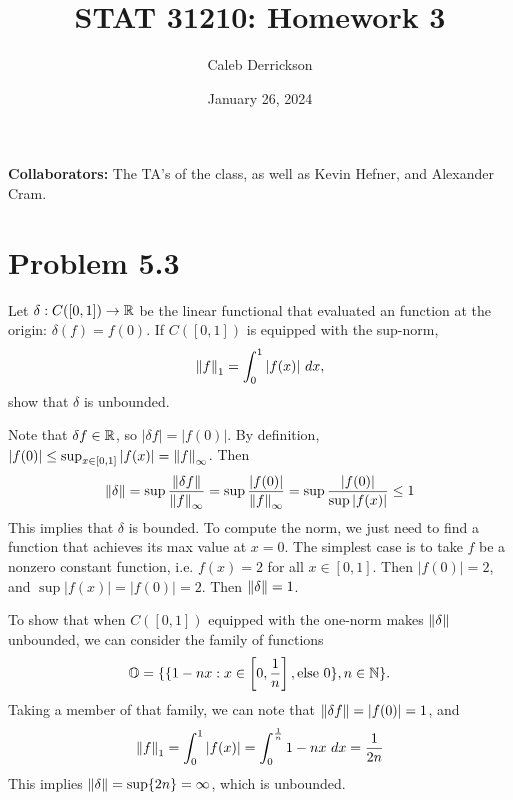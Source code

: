 

\title{STAT 31210: Homework 3}
\author{Caleb Derrickson}
\date{January 26, 2024}


\onehalfspacing
\maketitle
\allowdisplaybreaks
{\color{cit}\vspace{2mm}\noindent\textbf{Collaborators:}} The TA's of the class, as well as Kevin Hefner, and Alexander Cram.

\tableofcontents

\newpage
\section{Problem 5.3}
Let $\delta: C([0, 1]) \rightarrow \mathbb{R}$ be the linear functional that evaluated an function at the origin: $\delta(f) = f(0)$. If $C([0, 1])$ is equipped with the sup-norm,
\[\norm{f}_1 = \int_0^1 |f(x)| \ dx,\]
show that $\delta$ is unbounded.
\partbreak
\begin{solution}
    
    Note that $\delta f \in \mathbb{R}$, so $|\delta f| = |f(0)|$. By definition, $|f(0)| \leq \sup_{x \in [0, 1]} |f(x)| = \norm{f}_\infty$. Then 
    \[
   \norm{\delta} = \sup \frac{\norm{\delta f}}{\norm{f}_\infty} = \sup \frac{|f(0)|}{\norm{f}_\infty} = \sup \frac{|f(0)|}{\sup |f(x)|} \leq 1
    \]
    This implies that $\delta$ is bounded. To compute the norm, we just need to find a function that achieves its max value at $x = 0$. The simplest case is to take $f$ be a nonzero constant function, i.e. $f(x) = 2$ for all $x \in [0, 1]$. Then $|f(0)| = 2$, and $\sup |f(x)| = |f(0)| = 2$. Then $\norm{\delta} = 1$.
    \par
    
    \jump
    To show that when $C([0, 1])$ equipped with the one-norm makes $\norm{\delta}$ unbounded, we can consider the family of functions 
    \[\mathbb{O} = \{ \{1 - nx : x \in \left[0, \frac{1}{n}\right], \text{else } 0\}, n \in \mathbb{N}\}.\]
    Taking a member of that family, we can note that $\norm{\delta f} = |f(0)| = 1$, and
    \[\norm{f}_1 = \int_0^1 |f(x)| = \int_0^\frac{1}{n} 1 - nx \ dx = \frac{1}{2n}\]
    This implies $\norm{\delta} = \sup \{2n\} = \infty$, which is unbounded. 
\end{solution}

